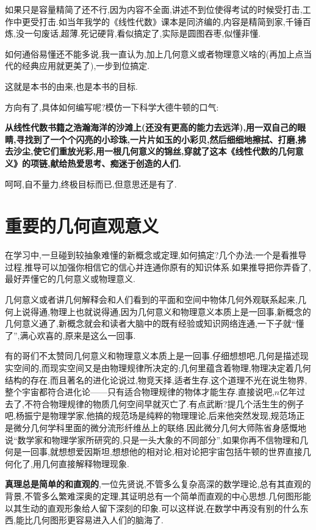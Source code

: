 \documentclass[12pt]{article}
\renewcommand{\,}{\ \text{,}}
\renewcommand{\.}{\ \text{.}}
\begin{document}
如果只是容量精简了还不行,因为内容不全面,讲述不到位使得考试的时候受打击,工作中更受打击.如当年我学的《线性代数》课本是同济编的,内容是精简到家,千锤百炼,没一句废话,超薄.死记硬背,看似搞定了,实际是圆图吞枣,似懂非懂.

如何通俗易懂还不能多说,我一直认为,加上几何意义或者物理意义啥的(再加上点当代的经典应用就更美了),一步到位搞定.

这就是本书的由来,也是本书的目标.

方向有了,具体如何编写呢?模仿一下科学大德牛顿的口气:

\textbf{从线性代数书籍之浩瀚海洋的沙滩上(还没有更高的能力去远洋),用一双自己的眼睛,寻找到了一个个闪亮的小珍珠,一片片如玉的小彩贝,然后细细地擦拭、打磨,拂去沙尘,使它们重放光彩,用一根几何意义的锦丝,穿就了这本《线性代数的几何意义》的项链,献给热爱思考、痴迷于创造的人们.}

呵呵,自不量力,终极目标而已,但意思还是有了.

\section{重要的几何直观意义}

在学习中,一旦碰到较抽象难懂的新概念或定理,如何搞定?几个办法:一个是看推导过程,推导可以加强你相信它的信心并连通你原有的知识体系.如果推导把你弄昏了,最好弄懂它的几何意义或物理意义.

几何意义或者讲几何解释会和人们看到的平面和空间中物体几何外观联系起来,几何上说得通,物理上也就说得通,因为几何意义和物理意义本质上是一回事,新概念的几何意义通了,新概念就会和读者大脑中的既有经验或知识网络连通,一下子就``懂了'',满心欢喜的,原来是这么一回事.

有的哥们不太赞同几何意义和物理意义本质上是一回事.仔细想想吧,几何是描述现实空间的,而现实空间又是由物理规律所决定的;几何里蕴含着物理,物理决定着几何结构的存在.而且著名的进化论说过,物竞天择,适者生存.这个道理不光在说生物界,整个宇宙都符合进化论——只有适合物理规律的物体才能生存.直接说吧,$n$亿年过去了,不符合物理规律的物质几何空间早就灭亡了.有点武断?提几个活生生的例子吧,杨振宁是物理学家,他搞的规范场是纯粹的物理理论,后来他突然发现,规范场正是微分几何学科里面的微分流形纤维丛上的联络.因此微分几何大师陈省身感慨地说``数学家和物理学家所研究的,只是一头大象的不同部分'',如果你再不信物理和几何是一回事,就想想爱因斯坦,想想他的相对论,相对论把宇宙包括牛顿的世界直接几何化了,用几何直接解释物理现象.

\textbf{真理总是简单的和直观的},一位先贤说,不管多么复杂高深的数学理论,总有其直观的背景,不管多么繁难深奥的定理,其证明总有一个简单而直观的中心思想.几何图形能以其生动的直观形象给人留下深刻的印象.可以这样说,在数学中再没有别的什么东西,能比几何图形更容易进入人们的脑海了.
\end{document}
